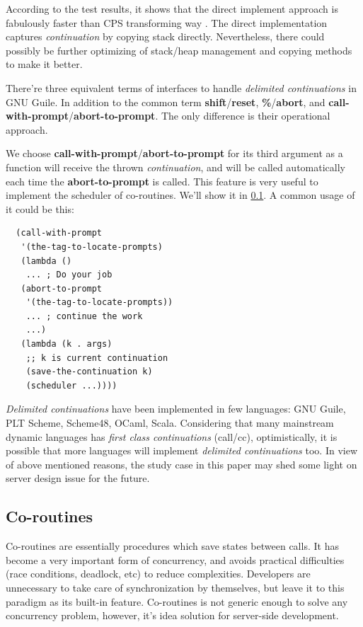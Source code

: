 \documentclass[numbers,numberedpars]{sigplanconf}
\begin{document}
According to the test results, it shows that the direct implement approach is fabulously faster than CPS transforming way
\citep{Gasbichler:2002:FSC:581478.581504}. The direct implementation captures {\it continuation} by copying stack directly.
Nevertheless, there could possibly be further optimizing of stack/heap management and copying methods to make it better.

There're three equivalent terms of interfaces to handle {\it delimited continuations} in GNU Guile. In addition to the common term
{\bf shift}/{\bf reset},
{\bf \%}/{\bf abort}, and {\bf call-with-prompt}/{\bf abort-to-prompt}. The only difference is their operational approach.

We choose {\bf call-with-prompt}/{\bf abort-to-prompt} for its third argument as a function will receive the thrown {\it continuation}, and will be
called automatically each time the {\bf abort-to-prompt} is called. This feature is very useful to implement the scheduler of co-routines. We'll show it
in \ref{Co-routines}. A common usage of it could be this:

\begin{lstlisting}
  (call-with-prompt
   '(the-tag-to-locate-prompts)
   (lambda ()
    ... ; Do your job
   (abort-to-prompt
    '(the-tag-to-locate-prompts))
    ... ; continue the work
    ...)
   (lambda (k . args)
    ;; k is current continuation
    (save-the-continuation k)
    (scheduler ...))))
\end{lstlisting}

{\it Delimited continuations} have been implemented in few languages: GNU Guile, PLT Scheme, Scheme48, OCaml, Scala.
Considering that many mainstream dynamic languages has {\it first class continuations} (call/cc), optimistically, it is possible that more languages
will implement {\it delimited continuations} too. In view of above mentioned reasons, the study case in this paper may shed some light on server
design issue for the future.

\subsection{Co-routines} \label{Co-routines}

Co-routines are essentially procedures which save states between calls. It has become a very important form of concurrency, and avoids practical
difficulties (race conditions, deadlock, etc) to reduce complexities. Developers are unnecessary to take care of synchronization by
themselves, but leave it to this paradigm as its built-in feature. Co-routines is not generic enough to solve any concurrency problem, however,
it's idea solution for server-side development.
\end{document}
